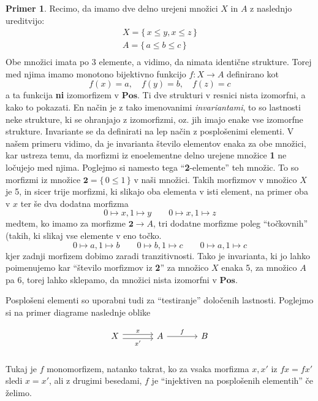 \documentclass[12pt,a4paper]{book}
\theoremstyle{definition}
\theoremstyle{plain}
\theoremstyle{definition}
\newtheorem{primer}{Primer}[section]
\theoremstyle{remark}
\newcommand{\cat}[1]{\textbf{#1}}
\renewcommand{\set}[1]{\{\,#1\,\}}
\begin{document}
\begin{primer}
Recimo, da imamo dve delno urejeni množici $X$ in $A$ z naslednjo ureditvijo:
\begin{align*}
X = \set{x \leq y, x \leq z} \\
A = \set{a \leq b \leq c} \\
\end{align*}
Obe množici imata po 3 elemente, a vidimo, da nimata identične strukture. Torej med njima imamo monotono bijektivno funkcijo $f : X \to A$ definirano kot
$$f(x) = a, \quad f(y) = b, \quad f(z) = c$$
a ta funkcija \textbf{ni} izomorfizem v $\cat{Pos}$. Ti dve strukturi v resnici nista izomorfni, a kako to pokazati. En način je z tako imenovanimi \textit{invariantami}, to so lastnosti neke strukture, ki se ohranjajo z izomorfizmi, oz. jih imajo enake vse izomorfne strukture. Invariante se da definirati na lep način z posplošenimi elementi. V našem primeru vidimo, da je invarianta število elementov enaka za obe množici, kar ustreza temu, da morfizmi iz enoelementne delno urejene množice \textbf{1} ne ločujejo med njima. Poglejmo si namesto tega "`\textbf{2}-elemente"' teh množic. To so morfizmi iz množice $\textbf{2} = \set{0 \leq 1}$ v naši množici. Takih morfizmov v množico $X$ je 5, in sicer trije morfizmi, ki slikajo oba elementa v isti element, na primer oba v $x$ ter še dva dodatna morfizma
$$0 \mapsto x, 1 \mapsto y \qquad 0 \mapsto x, 1 \mapsto z$$
medtem, ko imamo za morfizme $\textbf{2} \to A$, tri dodatne morfizme poleg "`točkovnih"' (takih, ki slikaj vse elemente v eno točko.
$$0 \mapsto a, 1 \mapsto b \qquad 0 \mapsto b, 1 \mapsto c \qquad 0 \mapsto a, 1 \mapsto c$$
kjer zadnji morfizem dobimo zaradi tranzitivnosti.
Tako je invarianta, ki jo lahko poimenujemo kar "`število morfizmov iz \textbf{2}"' za množico $X$ enaka 5, za množico $A$ pa 6, torej lahko sklepamo, da množici nista izomorfni v $\cat{Pos}$.
\end{primer}

Posplošeni elementi so uporabni tudi za "`testiranje"' določenih lastnosti. Poglejmo si na primer diagrame naslednje oblike

$$\begin{tikzcd}[column sep=large]
X \ar[r, shift left, "x"] \ar[r, shift right, "x'"'] & A \ar[r, "f"] & B \\
\end{tikzcd}$$
Tukaj je $f$ monomorfizem, natanko takrat, ko za vsaka morfizma $x, x'$ iz $fx = fx'$ sledi $x = x'$, ali z drugimi besedami, $f$ je "`injektiven na posplošenih elementih"' če želimo.
\end{document}
